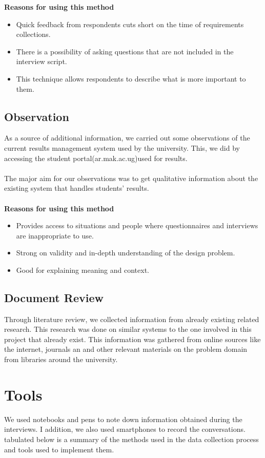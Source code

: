 \textbf{Reasons for using this method}
\begin{itemize}
\item  Quick feedback from respondents cuts short on the time of requirements collections.
\item There is a possibility of asking questions that are not included in the interview script.
\item This technique allows respondents to describe what is more important to them.
\end{itemize}

\subsection{Observation}
As a source of additional information, we carried out some observations of the current results management system used by the university. This, we did by accessing the student portal(ar.mak.ac.ug)used for results. \\~\\
The major aim for our observations was to get qualitative information about the existing system that handles students’ results.\\~\\

\textbf{Reasons for using this method}
\begin{itemize}
\item Provides access to situations and people where questionnaires and interviews are inappropriate to use.
\item Strong on validity and in-depth understanding of the design problem.
\item Good for explaining meaning and context.
\end{itemize}


\subsection{Document Review}
Through literature review, we collected information from already existing related research. This research was done on similar systems to the one involved in this project that already exist. This information was gathered from online sources like the internet, journals an and other relevant materials on the problem domain from libraries around the university.

\section{Tools}
We used notebooks and pens to note down information obtained during the interviews. I addition, we also used smartphones to record the conversations. tabulated below is a summary of the methods used in the data collection process and tools used to implement them.\\~\\

